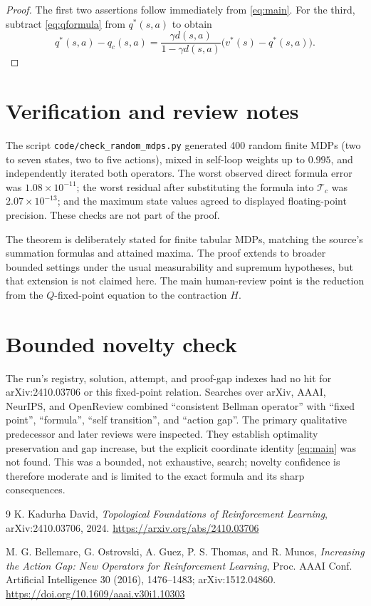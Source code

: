 \documentclass[11pt]{article}
\newcommand{\Tc}{\mathcal T_{\!c}}
\begin{document}
\begin{proof}
The first two assertions follow immediately from \eqref{eq:main}.  For the
third, subtract \eqref{eq:qformula} from $q^*(s,a)$ to obtain
\[
 q^*(s,a)-q_c(s,a)
 =\frac{\gamma d(s,a)}{1-\gamma d(s,a)}
   \bigl(v^*(s)-q^*(s,a)\bigr).
\]
\end{proof}

\section{Verification and review notes}

The script \texttt{code/check\_random\_mdps.py} generated 400 random finite
MDPs (two to seven states, two to five actions), mixed in self-loop weights up
to $0.995$, and independently iterated both operators.  The worst observed
direct formula error was $1.08\times10^{-11}$; the worst residual after
substituting the formula into $\Tc$ was $2.07\times10^{-13}$; and the maximum
state values agreed to displayed floating-point precision.  These checks are
not part of the proof.

The theorem is deliberately stated for finite tabular MDPs, matching the
source's summation formulas and attained maxima.  The proof extends to broader
bounded settings under the usual measurability and supremum hypotheses, but
that extension is not claimed here.  The main human-review point is the
reduction from the $Q$-fixed-point equation to the contraction $H$.

\section{Bounded novelty check}

The run's registry, solution, attempt, and proof-gap indexes had no hit for
arXiv:2410.03706 or this fixed-point relation.  Searches over arXiv, AAAI,
NeurIPS, and OpenReview combined ``consistent Bellman operator'' with
``fixed point'', ``formula'', ``self transition'', and ``action gap''.
The primary qualitative predecessor \cite{bellemare} and later reviews were
inspected.  They establish optimality preservation and gap increase, but the
explicit coordinate identity \eqref{eq:main} was not found.  This was a
bounded, not exhaustive, search; novelty confidence is therefore moderate and
is limited to the exact formula and its sharp consequences.

\begin{thebibliography}{9}
K. Kadurha David,
\emph{Topological Foundations of Reinforcement Learning},
arXiv:2410.03706, 2024.
\url{https://arxiv.org/abs/2410.03706}

M. G. Bellemare, G. Ostrovski, A. Guez, P. S. Thomas, and R. Munos,
\emph{Increasing the Action Gap: New Operators for Reinforcement Learning},
Proc. AAAI Conf. Artificial Intelligence 30 (2016), 1476--1483;
arXiv:1512.04860.
\url{https://doi.org/10.1609/aaai.v30i1.10303}
\end{thebibliography}
\end{document}
